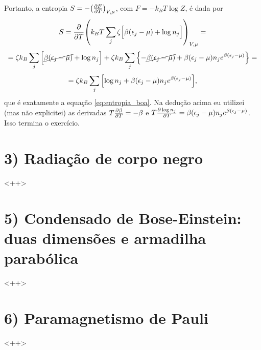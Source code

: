 \documentclass[a4paper,10pt]{article}
\begin{document}
Portanto, a entropia $S = -\qty(\pdv{F}{T})_{V,\mu}$, com $F = -k_B T \log Z$, é dada por
$$
S = \pdv{T} \qty(k_B T \sum_{j} \zeta \Big[\beta(\epsilon_j-\mu) + \log n_j\Big])_{V,\mu} =
$$
$$
= \zeta k_B \sum_{j} \Big[\cancel{\beta(\epsilon_j-\mu)} + \log n_j\Big] +
\zeta k_B \sum_{j} \qty{-\cancel{\beta (\epsilon_j - \mu)} + \beta(\epsilon_j-\mu) n_j e^{\beta(\epsilon_j-\mu)}} =
$$
$$
= \zeta k_B \sum_{j} \qty[\log n_j + \beta (\epsilon_j - \mu) n_j e^{\beta(\epsilon_j-\mu)}],
$$
que é exatamente a equação \ref{eq:entropia_boa}. Na dedução acima eu utilizei (mas não explicitei) as derivadas $T \pdv{\beta}{T} = -\beta$ e $T \pdv{\log n_j}{T} = \beta (\epsilon_j-\mu) n_j e^{\beta(\epsilon_j-\mu)}$. Isso termina o exercício.

\pagebreak

\section*{3) Radiação de corpo negro}

<++>

\pagebreak

\section*{5) Condensado de Bose-Einstein: duas dimensões e armadilha parabólica}

<++>

\pagebreak

\section*{6) Paramagnetismo de Pauli}

<++>

\pagebreak
\end{document}

